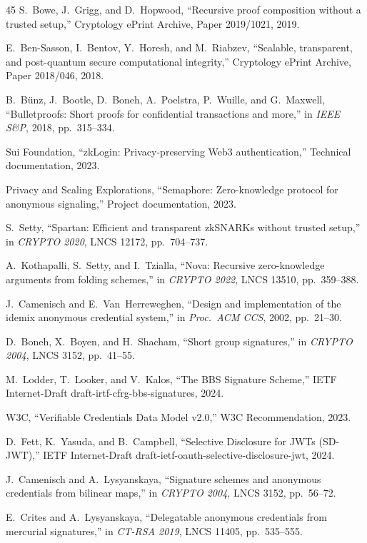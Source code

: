 \documentclass[journal,twoside,10pt]{IEEEtran}
\begin{document}
\begin{thebibliography}{45}
S.~Bowe, J.~Grigg, and D.~Hopwood, ``Recursive proof composition without a
trusted setup,'' Cryptology ePrint Archive, Paper 2019/1021, 2019.

E.~Ben-Sasson, I.~Bentov, Y.~Horesh, and M.~Riabzev, ``Scalable, transparent,
and post-quantum secure computational integrity,'' Cryptology ePrint
Archive, Paper 2018/046, 2018.

B.~B{\"u}nz, J.~Bootle, D.~Boneh, A.~Poelstra, P.~Wuille, and G.~Maxwell,
``Bulletproofs: Short proofs for confidential transactions and more,'' in
\emph{IEEE S\&P}, 2018, pp.~315--334.

Sui Foundation, ``zkLogin: Privacy-preserving Web3 authentication,''
Technical documentation, 2023.

Privacy and Scaling Explorations, ``Semaphore: Zero-knowledge protocol for
anonymous signaling,'' Project documentation, 2023.

S.~Setty, ``Spartan: Efficient and transparent zkSNARKs without trusted
setup,'' in \emph{CRYPTO 2020}, LNCS 12172, pp.~704--737.

A.~Kothapalli, S.~Setty, and I.~Tzialla, ``Nova: Recursive zero-knowledge
arguments from folding schemes,'' in \emph{CRYPTO 2022}, LNCS 13510,
pp.~359--388.

J.~Camenisch and E.~Van~Herreweghen, ``Design and implementation of the
idemix anonymous credential system,'' in \emph{Proc.\ ACM CCS}, 2002,
pp.~21--30.

D.~Boneh, X.~Boyen, and H.~Shacham, ``Short group signatures,'' in
\emph{CRYPTO 2004}, LNCS 3152, pp.~41--55.

M.~Lodder, T.~Looker, and V.~Kalos, ``The BBS Signature Scheme,'' IETF
Internet-Draft draft-irtf-cfrg-bbs-signatures, 2024.

W3C, ``Verifiable Credentials Data Model v2.0,'' W3C Recommendation, 2023.

D.~Fett, K.~Yasuda, and B.~Campbell, ``Selective Disclosure for JWTs
(SD-JWT),'' IETF Internet-Draft draft-ietf-oauth-selective-disclosure-jwt,
2024.

J.~Camenisch and A.~Lysyanskaya, ``Signature schemes and anonymous
credentials from bilinear maps,'' in \emph{CRYPTO 2004}, LNCS 3152,
pp.~56--72.

E.~Crites and A.~Lysyanskaya, ``Delegatable anonymous credentials from
mercurial signatures,'' in \emph{CT-RSA 2019}, LNCS 11405, pp.~535--555.


\end{thebibliography}
\end{document}
